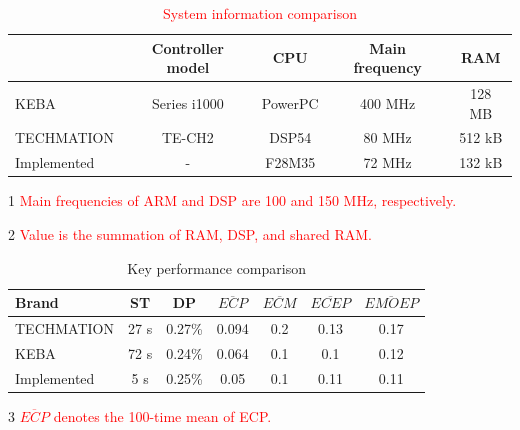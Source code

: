 \documentclass[journal,UTF8]{IEEEtran}
\begin{document}
	\begin{table}
		\scriptsize \caption{\textcolor{red}{System information comparison}}
		\label{table:systemComparison}
		\begin{center}
			\begin{threeparttable}
				\renewcommand{\arraystretch}{1.4}
				\setlength\tabcolsep{3pt}
				\begin{tabular}{|l|c|c|c|c|}	
					\hline
					&Controller model &CPU     &Main frequency       &RAM\\
					\hline
					KEBA        &Series i1000     &PowerPC &400 MHz              &128 MB  \\
					\hline
					TECHMATION  &TE-CH2           &DSP54    &80 MHz              &512 kB  \\
					\hline
					Implemented &-                &F28M35  &72 MHz\tnote{1} &132 kB\tnote{2} \\
					\hline			
				\end{tabular}
				\begin{tablenotes}
					\footnotesize
					\item[1] \textcolor{red}{Main frequencies of ARM and DSP are 100 and 150 MHz, respectively.}
					\item[2] \textcolor{red}{Value is the summation of RAM, DSP, and shared RAM.}
				\end{tablenotes}
			\end{threeparttable}
		\end{center}
	\end{table}
	\begin{table}
		\scriptsize \caption{Key performance comparison}
		\label{table:ComparisonG}
		\begin{center}
			\begin{threeparttable}
				\renewcommand{\arraystretch}{1.4}
				\setlength\tabcolsep{3pt}
				\begin{tabular}{|l|c|c|c|c|c|c|}
					\hline
					Brand & ST &DP&$\overline{ECP}$ \tnote{3}&$\overline{ECM}$&$\overline{ECEP}$ &$\overline{EMOEP}$\\
					\hline
					TECHMATION  & 27 s  &0.27\% &0.094 & 0.2 & 0.13 & 0.17 \\
					\hline
					KEBA        & 72 s  &0.24\% &0.064 & 0.1 & 0.1 & 0.12 \\
					\hline
					Implemented   & 5 s     &0.25\% &0.05 & 0.1 & 0.11 & 0.11\\
					\hline
				\end{tabular}
				\begin{tablenotes}
					\footnotesize
					\item[3] \textcolor{red}{$\overline{ECP}$ denotes the 100-time mean of ECP.}
				\end{tablenotes}
			\end{threeparttable}
		\end{center}
	\end{table}
\end{document}

